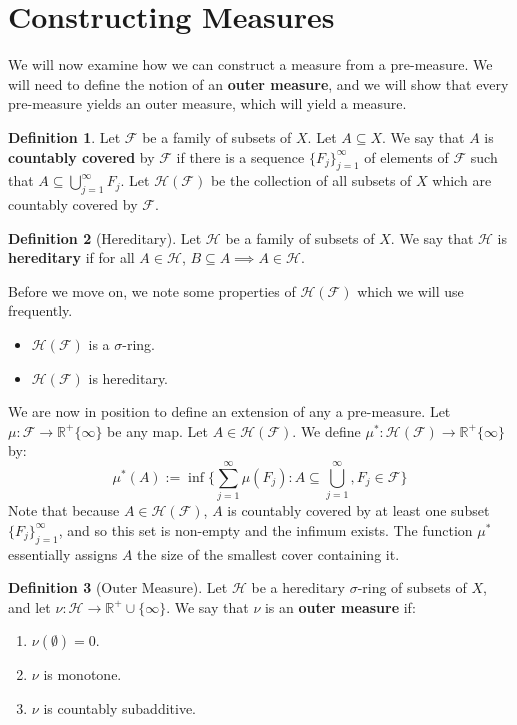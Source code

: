 \documentclass[11pt, oneside]{amsart}   	%
\theoremstyle{definition}
\newtheorem{definition}{Definition}[section]
\begin{document}
\section{Constructing Measures}

	We will now examine how we can construct a measure from a pre-measure. We will need to define the notion of an 
	\textbf{outer measure}, and we will show that every pre-measure yields an outer measure, which will yield a measure. 
	
	\begin{definition}
		Let $\mathcal F$ be a family of subsets of $X$. Let $A\subseteq X$. We say that $A$ is \textbf{countably covered} 
		by $\mathcal F$ if there is a sequence $\{F_j\}_{j = 1}^\infty$ of elements of $\mathcal F$ such that $A\subseteq
		\bigcup_{j = 1}^\infty F_j$. Let $\mathcal H(\mathcal F)$ be the collection of all subsets of $X$ which are countably 
		covered by $\mathcal F$. 
	\end{definition}
	
	\begin{definition}[Hereditary]
		Let $\mathcal H$ be a family of subsets of $X$. We say that $\mathcal H$ is \textbf{hereditary} if for all $A\in\mathcal 
		H$, $B\subseteq A\implies A\in\mathcal H$.
	\end{definition}
	
	Before we move on, we note some properties of $\mathcal H(\mathcal F)$ which we will use frequently. 
	
	\begin{itemize}
		\item $\mathcal H(\mathcal F)$ is a $\sigma$-ring.
		\item $\mathcal H(\mathcal F)$ is hereditary.
	\end{itemize}
	
	We are now in position to define an extension of any a pre-measure. Let $\mu : \mathcal F\rightarrow\mathbb 
	R^+\{\infty\}$ be any map. Let $A\in\mathcal H(\mathcal F)$. We define $\mu^* : \mathcal H(\mathcal F)\rightarrow
	\mathbb R^+\{\infty\}$ by:
	$$
		\mu^*(A) := \inf\{\sum_{j = 1}^\infty\mu(F_j) : A\subseteq\bigcup_{j = 1}^\infty, F_j\in\mathcal F\}
	$$
	Note that because $A\in\mathcal H(\mathcal F)$, $A$ is countably covered by at least one subset $\{F_j\}_{j = 1}^\infty$, 
	and so this set is non-empty and the infimum exists. The function $\mu^*$ essentially assigns $A$ the size of the smallest 
	cover containing it. 
	
	\begin{definition}[Outer Measure]
		Let $\mathcal H$ be a hereditary $\sigma$-ring of subsets of $X$, and let $\nu : \mathcal H\rightarrow\mathbb R^+
		\cup\{\infty\}$. We say that $\nu$ is an \textbf{outer measure} if:
		\begin{enumerate}
			\item $\nu(\emptyset) = 0$.
			\item $\nu$ is monotone.
			\item $\nu$ is countably subadditive.
		\end{enumerate}
	\end{definition}
	
\end{document}
